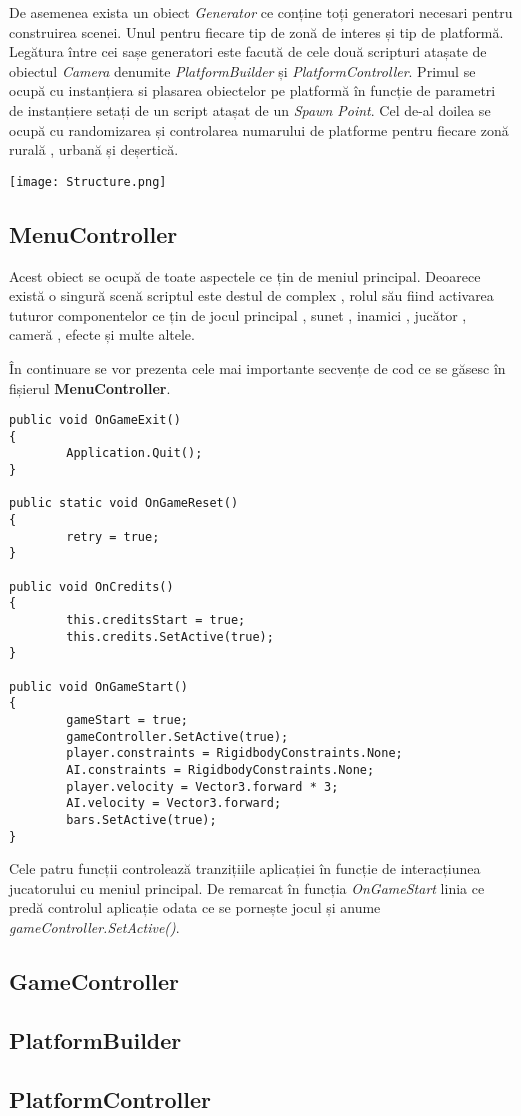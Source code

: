 De asemenea exista un obiect \textit{Generator} ce conține toți generatori necesari pentru construirea scenei. Unul pentru fiecare tip de zonă de interes și tip de platformă. Legătura între cei sașe generatori este facută de cele două scripturi atașate de obiectul \textit{Camera} denumite \textit{PlatformBuilder} și \textit{PlatformController}. Primul se ocupă cu instanțiera si plasarea obiectelor pe platformă în funcție de parametri de instanțiere setați de un script atașat de un \textit{Spawn Point}. Cel de-al doilea se ocupă cu randomizarea și controlarea numarului de platforme pentru fiecare zonă rurală , urbană și deșertică.\par

\texttt{[image: Structure.png]} \par

\subsection{MenuController}

Acest obiect se ocupă de toate aspectele ce țin de meniul principal. Deoarece există o singură scenă scriptul este destul de complex , rolul său fiind activarea tuturor componentelor ce țin de jocul principal , sunet , inamici , jucător , cameră , efecte și multe altele.\par

În continuare se vor prezenta cele mai importante secvențe de cod ce se găsesc în fișierul \textbf{MenuController}.\par

\begin{lstlisting}[caption=Caption example.,
  label=a_label]
public void OnGameExit()
{
        Application.Quit();
}

public static void OnGameReset()
{
        retry = true;
}

public void OnCredits()
{
        this.creditsStart = true;
        this.credits.SetActive(true);
}

public void OnGameStart()
{
        gameStart = true;
        gameController.SetActive(true);
        player.constraints = RigidbodyConstraints.None;
        AI.constraints = RigidbodyConstraints.None;
        player.velocity = Vector3.forward * 3;
        AI.velocity = Vector3.forward;
        bars.SetActive(true);
}
\end{lstlisting}

Cele patru funcții controlează tranzițiile aplicației în funcție de interacțiunea jucatorului cu meniul principal. De remarcat în funcția \textit{OnGameStart} linia ce predă controlul aplicație odata ce se pornește jocul și anume \textit{gameController.SetActive()}.\par

\subsection{GameController}

\subsection{PlatformBuilder}

\subsection{PlatformController}


